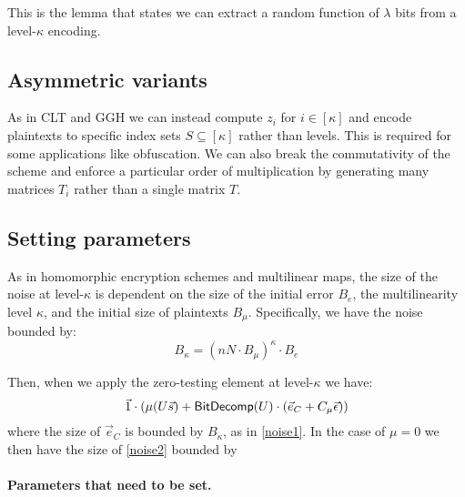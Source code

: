 \begin{lemma}
\label{extraction}
This is the lemma that states we can extract a random function of $\lambda$ bits from a level-$\kappa$ encoding.
\end{lemma}

\subsection{Asymmetric variants}

As in CLT and GGH we can instead compute $z_i$ for $i \in [\kappa]$ and encode plaintexts to specific index sets $S \subseteq [\kappa]$ rather than levels.  This is required for some applications like obfuscation.  We can also break the commutativity of the scheme and enforce a particular order of multiplication by generating many matrices $T_i$ rather than a single matrix $T$.

\subsection{Setting parameters}

As in homomorphic encryption schemes and multilinear maps, the size of the noise at level-$\kappa$ is dependent on the size of the initial error $B_e$, the multilinearity level $\kappa$, and the initial size of plaintexts $B_\mu$.  Specifically, we have the noise bounded by:
\begin{equation}
\label{noise1}
B_\kappa = (nN\cdot B_\mu)^\kappa \cdot B_e
\end{equation}

Then, when we apply the zero-testing element at level-$\kappa$ we have:
\begin{equation}
\label{noise2}
\vec{1}\cdot(\mu(U \vec{s}) + \mathsf{BitDecomp}(U)\cdot (\vec{e}_C + C_\mu\vec{\epsilon}))\\
\end{equation}
where the size of $\vec{e}_C$ is bounded by $B_\kappa$, as in \eqref{noise1}.  In the case of $\mu = 0$ we then have the size of \eqref{noise2} bounded by 

\paragraph{Parameters that need to be set.}

